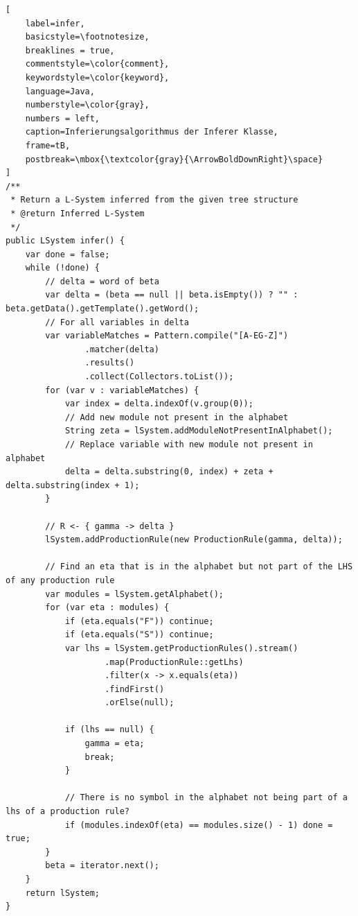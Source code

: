 \begin{lstlisting}[
    label=infer,
    basicstyle=\footnotesize,
    breaklines = true,
    commentstyle=\color{comment},
    keywordstyle=\color{keyword},
    language=Java,
    numberstyle=\color{gray},
    numbers = left,
    caption=Inferierungsalgorithmus der Inferer Klasse,
    frame=tB,
    postbreak=\mbox{\textcolor{gray}{\ArrowBoldDownRight}\space}
]
/**
 * Return a L-System inferred from the given tree structure
 * @return Inferred L-System
 */
public LSystem infer() {
    var done = false;
    while (!done) {
        // delta = word of beta
        var delta = (beta == null || beta.isEmpty()) ? "" : beta.getData().getTemplate().getWord();
        // For all variables in delta
        var variableMatches = Pattern.compile("[A-EG-Z]")
                .matcher(delta)
                .results()
                .collect(Collectors.toList());
        for (var v : variableMatches) {
            var index = delta.indexOf(v.group(0));
            // Add new module not present in the alphabet
            String zeta = lSystem.addModuleNotPresentInAlphabet();
            // Replace variable with new module not present in alphabet
            delta = delta.substring(0, index) + zeta + delta.substring(index + 1);
        }

        // R <- { gamma -> delta }
        lSystem.addProductionRule(new ProductionRule(gamma, delta));

        // Find an eta that is in the alphabet but not part of the LHS of any production rule
        var modules = lSystem.getAlphabet();
        for (var eta : modules) {
            if (eta.equals("F")) continue;
            if (eta.equals("S")) continue;
            var lhs = lSystem.getProductionRules().stream()
                    .map(ProductionRule::getLhs)
                    .filter(x -> x.equals(eta))
                    .findFirst()
                    .orElse(null);

            if (lhs == null) {
                gamma = eta;
                break;
            }

            // There is no symbol in the alphabet not being part of a lhs of a production rule?
            if (modules.indexOf(eta) == modules.size() - 1) done = true;
        }
        beta = iterator.next();
    }
    return lSystem;
}
\end{lstlisting}

\newpage

